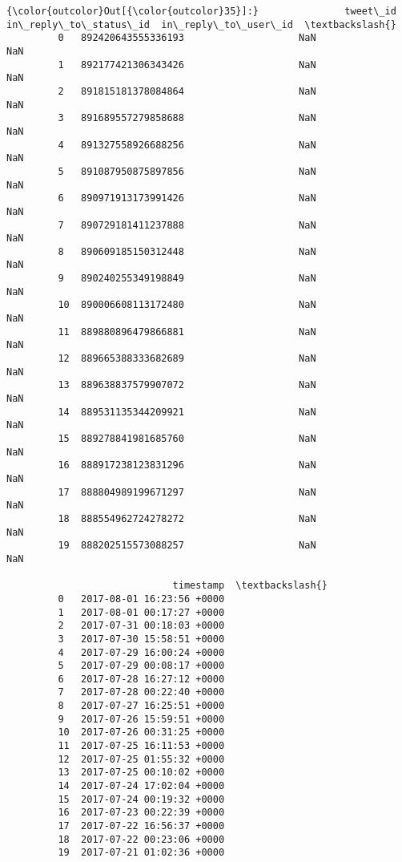\documentclass[11pt]{article}
\begin{document}
\begin{Verbatim}[commandchars=\\\{\}]
{\color{outcolor}Out[{\color{outcolor}35}]:}               tweet\_id  in\_reply\_to\_status\_id  in\_reply\_to\_user\_id  \textbackslash{}
         0   892420643555336193                    NaN                  NaN   
         1   892177421306343426                    NaN                  NaN   
         2   891815181378084864                    NaN                  NaN   
         3   891689557279858688                    NaN                  NaN   
         4   891327558926688256                    NaN                  NaN   
         5   891087950875897856                    NaN                  NaN   
         6   890971913173991426                    NaN                  NaN   
         7   890729181411237888                    NaN                  NaN   
         8   890609185150312448                    NaN                  NaN   
         9   890240255349198849                    NaN                  NaN   
         10  890006608113172480                    NaN                  NaN   
         11  889880896479866881                    NaN                  NaN   
         12  889665388333682689                    NaN                  NaN   
         13  889638837579907072                    NaN                  NaN   
         14  889531135344209921                    NaN                  NaN   
         15  889278841981685760                    NaN                  NaN   
         16  888917238123831296                    NaN                  NaN   
         17  888804989199671297                    NaN                  NaN   
         18  888554962724278272                    NaN                  NaN   
         19  888202515573088257                    NaN                  NaN   
         
                             timestamp  \textbackslash{}
         0   2017-08-01 16:23:56 +0000   
         1   2017-08-01 00:17:27 +0000   
         2   2017-07-31 00:18:03 +0000   
         3   2017-07-30 15:58:51 +0000   
         4   2017-07-29 16:00:24 +0000   
         5   2017-07-29 00:08:17 +0000   
         6   2017-07-28 16:27:12 +0000   
         7   2017-07-28 00:22:40 +0000   
         8   2017-07-27 16:25:51 +0000   
         9   2017-07-26 15:59:51 +0000   
         10  2017-07-26 00:31:25 +0000   
         11  2017-07-25 16:11:53 +0000   
         12  2017-07-25 01:55:32 +0000   
         13  2017-07-25 00:10:02 +0000   
         14  2017-07-24 17:02:04 +0000   
         15  2017-07-24 00:19:32 +0000   
         16  2017-07-23 00:22:39 +0000   
         17  2017-07-22 16:56:37 +0000   
         18  2017-07-22 00:23:06 +0000   
         19  2017-07-21 01:02:36 +0000   
         

\end{Verbatim}
\end{document}
